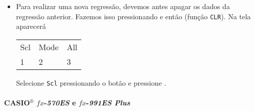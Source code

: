 \begin{itemize}
\item Para realizar uma nova regressão, devemos antes apagar os dados da regressão anterior. Fazemos isso pressionando  e então  (função \texttt{CLR}). Na tela aparecerá
\begin{center}
\begin{tabular}{p{2cm}p{2cm}p{2cm}}
Scl & Mode & All \\
1 & 2 & 3
\end{tabular}
\end{center}
%
Selecione \texttt{Scl} pressionando o botão  e pressione \keystroke{~=~}.
\end{itemize}

\paragraph{CASIO$^{\circledR}$ $fx$-\textit{570ES} e $fx$-\textit{991ES Plus}}

